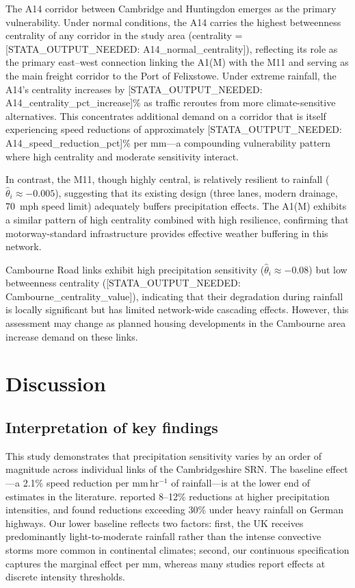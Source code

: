 \documentclass[review]{elsarticle}
\begin{document}
The A14 corridor between Cambridge and Huntingdon emerges as the primary vulnerability. Under normal conditions, the A14 carries the highest betweenness centrality of any corridor in the study area (centrality = [STATA\_OUTPUT\_NEEDED: A14\_normal\_centrality]), reflecting its role as the primary east--west connection linking the A1(M) with the M11 and serving as the main freight corridor to the Port of Felixstowe. Under extreme rainfall, the A14's centrality increases by [STATA\_OUTPUT\_NEEDED: A14\_centrality\_pct\_increase]\% as traffic reroutes from more climate-sensitive alternatives. This concentrates additional demand on a corridor that is itself experiencing speed reductions of approximately [STATA\_OUTPUT\_NEEDED: A14\_speed\_reduction\_pct]\% per mm---a compounding vulnerability pattern where high centrality and moderate sensitivity interact.

In contrast, the M11, though highly central, is relatively resilient to rainfall ($\hat{\theta}_i \approx -0.005$), suggesting that its existing design (three lanes, modern drainage, 70~mph speed limit) adequately buffers precipitation effects. The A1(M) exhibits a similar pattern of high centrality combined with high resilience, confirming that motorway-standard infrastructure provides effective weather buffering in this network.

Cambourne Road links exhibit high precipitation sensitivity ($\hat{\theta}_i \approx -0.08$) but low betweenness centrality ([STATA\_OUTPUT\_NEEDED: Cambourne\_centrality\_value]), indicating that their degradation during rainfall is locally significant but has limited network-wide cascading effects. However, this assessment may change as planned housing developments in the Cambourne area increase demand on these links.


\section{Discussion}
\label{sec:discussion}

\subsection{Interpretation of key findings}
\label{sec:disc:summary}

This study demonstrates that precipitation sensitivity varies by an order of magnitude across individual links of the Cambridgeshire SRN. The baseline effect---a 2.1\% speed reduction per mm\,hr$^{-1}$ of rainfall---is at the lower end of estimates in the literature. \citet{hranac2006empirical} reported 8--12\% reductions at higher precipitation intensities, and \citet{becker2026rainfall} found reductions exceeding 30\% under heavy rainfall on German highways. Our lower baseline reflects two factors: first, the UK receives predominantly light-to-moderate rainfall rather than the intense convective storms more common in continental climates; second, our continuous specification captures the marginal effect per mm, whereas many studies report effects at discrete intensity thresholds.
\end{document}
